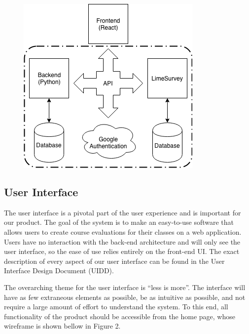 \documentclass{article}
\begin{document}
\begin{center}
\begin{figure}[H]
\centering
{}
\vspace{2mm}
\label{fig:componentdiagram}
{\includegraphics[scale=.75]{images/component_diagram.png}}
\end{figure}
\end{center}

\subsection{User Interface}
The user interface is a pivotal part of the user experience and is important for our product. The goal of the system is to make an easy-to-use software that allows users to create course evaluations for their classes on a web application.  Users have no interaction with the back-end architecture and will only see the user interface, so the ease of use relies entirely on the front-end UI.  The exact description of every aspect of our user interface can be found in the User Interface Design Document (UIDD). 

The overarching theme for the user interface is ``less is more''.  The interface will have as few extraneous elements as possible, be as intuitive as possible, and not require a large amount of effort to understand the system.  To this end, all functionality of the product should be accessible from the home page, whose wireframe is shown bellow in Figure 2. 
\end{document}
